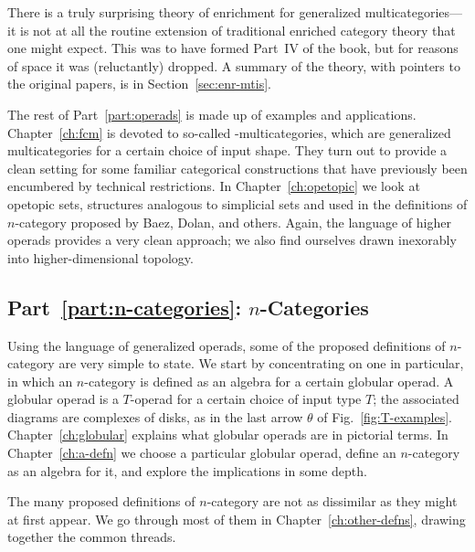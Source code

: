 There is a truly surprising theory of enrichment%
%
%
%
%
for generalized
multicategories---it is not at all the routine extension of traditional
enriched category theory that one might expect.  This was to have formed
Part~IV of the book, but for reasons of space it was (reluctantly) dropped.  A
summary of the theory, with pointers to the original papers, is
in Section~\ref{sec:enr-mtis}.  

The rest of Part~\ref{part:operads} is made up of examples and
applications.  Chapter~\ref{ch:fcm} is devoted to so-called
\fc-multicategories,%
%
%
which are generalized multicategories for a certain choice of input shape.
They turn out to provide a clean setting for some familiar categorical
constructions that have previously been encumbered by technical
restrictions.  In Chapter~\ref{ch:opetopic} we look at opetopic sets,
structures analogous to simplicial sets and used in the definitions of
$n$-category proposed by Baez, Dolan, and others.  Again, the language of
higher operads provides a very clean approach; we also find ourselves drawn
inexorably into higher-dimensional topology.


\subsection*{Part~\ref{part:n-categories}: $n$-Categories}

Using the language of generalized operads, some of the proposed definitions
of $n$-category are very simple to state.  We start by concentrating on one
in particular, in which an $n$-category is defined as an algebra for a
certain globular operad.  A globular operad%
%
%
is a $T$-operad for a certain
choice of input type $T$; the associated diagrams are complexes of disks,
as in the last arrow $\theta$ of Fig.~\ref{fig:T-examples}.
Chapter~\ref{ch:globular} explains what globular operads are in pictorial
terms.  In Chapter~\ref{ch:a-defn} we choose a particular globular operad,
define an $n$-category as an algebra for it, and explore the implications
in some depth.  

The many proposed definitions of $n$-category are not as dissimilar as they
might at first appear.  We go through most of them in
Chapter~\ref{ch:other-defns}, drawing together the common threads.



